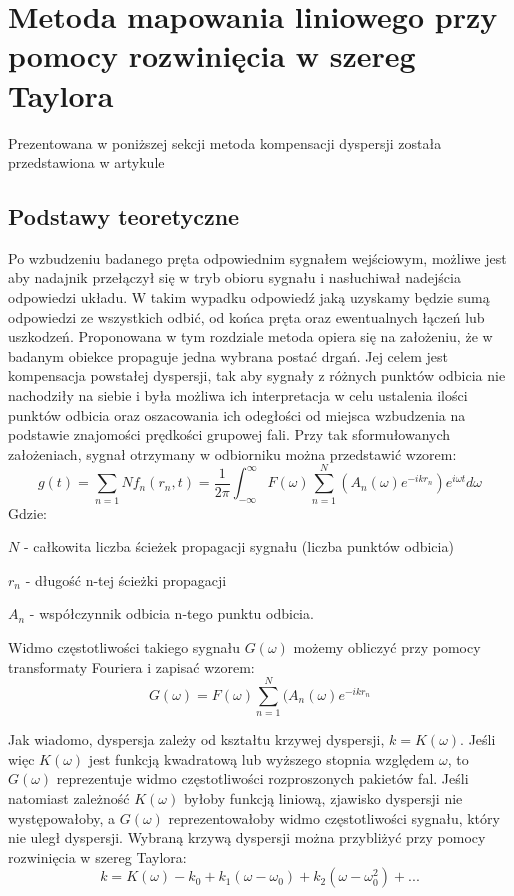 
\section{Metoda mapowania liniowego przy pomocy rozwinięcia w szereg Taylora}
\label{sec:Taylor}
Prezentowana w poniższej sekcji metoda kompensacji dyspersji została przedstawiona w artykule \cite{kasia5}
\subsection{Podstawy teoretyczne}
Po wzbudzeniu badanego pręta odpowiednim sygnałem wejściowym, możliwe jest aby nadajnik przełączył się w tryb obioru sygnału i nasłuchiwał nadejścia odpowiedzi układu. W takim wypadku odpowiedź jaką uzyskamy będzie sumą odpowiedzi ze wszystkich odbić, od końca pręta oraz ewentualnych łączeń lub uszkodzeń.  Proponowana w tym rozdziale metoda opiera się na założeniu, że w badanym obiekce propaguje jedna wybrana postać drgań. Jej celem jest kompensacja powstałej dyspersji, tak aby sygnały z różnych punktów odbicia nie nachodziły na siebie i była możliwa ich interpretacja w celu ustalenia ilości punktów odbicia oraz oszacowania ich odegłości od miejsca wzbudzenia na podstawie znajomości prędkości grupowej fali. Przy tak sformułowanych założeniach, sygnał otrzymany w odbiorniku można przedstawić wzorem:
\begin{equation}
g(t) = \sum\limits_{n=1}{N}f_n(r_n,t)=\frac{1}{2\pi}\int _{-\infty}^{\infty}F(\omega)\sum\limits_{n=1}^{N}(A_n(\omega)e^{-ikr_n})e^{i\omega t} d\omega \label{eq:g(t)_taylor}
\end{equation}
Gdzie:

$N$ - całkowita liczba ścieżek propagacji sygnału (liczba punktów odbicia)

$r_n$ - długość n-tej ścieżki propagacji

$A_n$ - współczynnik odbicia n-tego punktu odbicia.

Widmo częstotliwości takiego sygnału $G(\omega)$  możemy obliczyć przy pomocy transformaty Fouriera i zapisać wzorem:
\begin{equation}
G(\omega) = F(\omega)\sum\limits_{n=1}^{N}(A_n(\omega)e^{-ikr_n} \label{eq:G(omega)_taylor}
\end{equation}

Jak wiadomo, dyspersja zależy od kształtu krzywej dyspersji, $k = K(\omega)$. Jeśli więc $K(\omega)$ jest funkcją kwadratową lub wyższego stopnia względem $\omega$, to $G(\omega)$ reprezentuje widmo częstotliwości rozproszonych pakietów fal. Jeśli natomiast zależność $K(\omega)$ byłoby funkcją liniową, zjawisko dyspersji nie występowałoby, a $G(\omega)$ reprezentowałoby widmo częstotliwości sygnału, który nie uległ dyspersji. 
Wybraną krzywą dyspersji można przybliżyć przy pomocy rozwinięcia w szereg Taylora:
\begin{equation}
k = K(\omega) - k_0+k_1(\omega - \omega _0) + k_2(\omega - \omega _0^2)+... \label{eq:szereg_k}
\end{equation}

